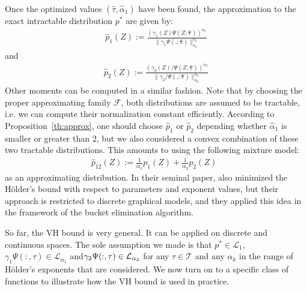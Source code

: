 \documentclass{article} %
\newcommand{\Holder}{H\"older\xspace}
\newcommand{\tauspace}{\mathcal{T}}
\def\btau{{\bm{\tau}}}
\def\proba{p}
\begin{document}
Once the optimized values $(\hat\tau,\hat\alpha_1)$ have been found, the approximation to the exact intractable distribution $\proba^*$ are given by:
\begin{eqnarray}
\hat\proba_1(Z) := \frac{(\gamma_1(Z)\Psi(Z;\hat\btau))^{\alpha_1}}{\|\gamma_1\Psi(.;\hat\btau)\|^{\alpha_1}_{\alpha_1}}
\end{eqnarray}
and 
\begin{eqnarray}
\hat\proba_2(Z) := \frac{(\gamma_2(Z)/\Psi(Z;\hat\btau))^{\alpha_2}}{\|\gamma_2/\Psi(.;\hat\btau)\|^{\alpha_2}_{\alpha_2}}
\end{eqnarray}
Other moments can be computed in a similar fashion. 
Note that by choosing the proper approximating family $\mathcal{F}$, both distributions are assumed to be tractable, i.e. we can compute their normalization constant efficiently.
According to Proposition~\ref{th:approx}, one should choose $\hat\proba_1$ or $\hat\proba_2$ depending whether $\hat\alpha_1$ is 
smaller or greater than 2, but we also considered a convex combination of these two tractable distributions. This amounts to using the 
following mixture model:
\begin{eqnarray}
\hat\proba_{12}(Z) := \frac {1}{\alpha_1}\proba_1(Z) + \frac {1}{\alpha_2}\proba_2(Z)
\enspace
\end{eqnarray}
as an approximating distribution.
In their seminal paper, \citet{liu11d} also minimized the \Holder's bound with respect to parameters and exponent values, but
their approach is restricted to %
 discrete graphical models, and they applied this idea in the framework of the bucket elimination algorithm.

So far, the VH bound is very general. It can be applied on discrete and continuous spaces. The sole assumption we made is that $\proba^*\in\mathcal{L}_1$, $\gamma_1\Psi(:,\tau)\in\mathcal{L}_{\alpha_1}$ and$\gamma_2\/\Psi(:,\tau)\in\mathcal{L}_{\alpha_2}$ for any $\tau\in\tauspace$ and any $\alpha_k$ in the
range of \Holder's exponents that are considered. We now turn on to a specific class of functions to illustrate how the VH bound is used in practice.

%
\end{document}
